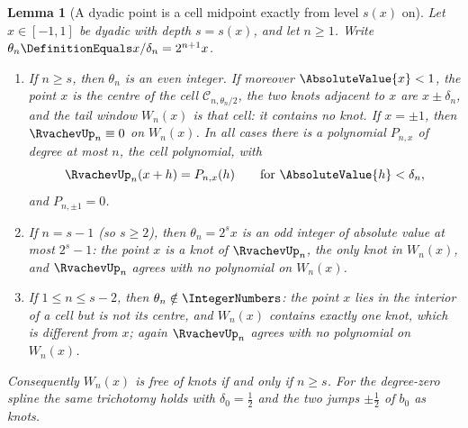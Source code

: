 \documentclass[11pt,oneside]{article}
\theoremstyle{plain}
\newtheorem{lemma}[theorem]{Lemma}
\theoremstyle{definition}
\theoremstyle{remark}
\newcommand{\upn}[1]{\RvachevUp_{#1}}
\newcommand{\dep}[1]{s\!\left(#1\right)}                    %
\begin{document}
\begin{lemma}[A dyadic point is a cell midpoint exactly from level $\dep{x}$ on]
\label{due:lem:set-midpoint}
Let $x\in[-1,1]$ be dyadic with depth $s=\dep{x}$, and let $n\ge1$.  Write
$\theta_n\DefinitionEquals x/\delta_n=2^{n+1}x$.
\begin{enumerate}
\item[(i)] If $n\ge s$, then $\theta_n$ is an even integer.  If moreover
      $\AbsoluteValue{x}<1$, the point $x$ is the centre of the cell
      $\mathcal C_{n,\theta_n/2}$, the two knots adjacent to $x$ are
      $x\pm\delta_n$, and the tail window $W_n(x)$ is that cell: it
      contains no knot.  If $x=\pm1$, then $\upn{n}\equiv0$ on $W_n(x)$.
      In all cases there is a polynomial $P_{n,x}$ of degree at most $n$,
      the \emph{cell polynomial}, with
      \begin{equation}
       \upn{n}(x+h)=P_{n,x}(h)\qquad\text{for }\AbsoluteValue{h}<\delta_n,
       \label{due:eq:set-cell-polynomial}
      \end{equation}
      and $P_{n,\pm1}=0$.
\item[(ii)] If $n=s-1$ (so $s\ge2$), then $\theta_n=2^{s}x$ is an odd
      integer of absolute value at most $2^{s}-1$: the point $x$ is a knot
      of $\upn{n}$, the only knot in $W_n(x)$, and $\upn{n}$ agrees with no
      polynomial on $W_n(x)$.
\item[(iii)] If $1\le n\le s-2$, then $\theta_n\notin\IntegerNumbers$: the
      point $x$ lies in the interior of a cell but is not its centre, and
      $W_n(x)$ contains exactly one knot, which is different from $x$; again
      $\upn{n}$ agrees with no polynomial on $W_n(x)$.
\end{enumerate}
Consequently $W_n(x)$ is free of knots if and only if $n\ge s$.  For the
degree-zero spline the same trichotomy holds with $\delta_0=\frac12$ and
the two jumps $\pm\frac12$ of $b_0$ as knots.
\end{lemma}
\end{document}
